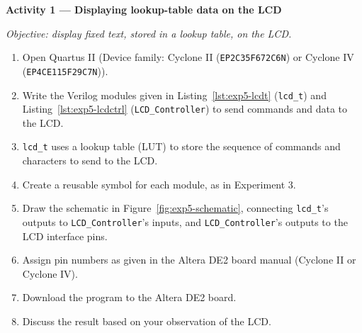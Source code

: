 \begin{procedure}

  \textbf{Activity 1 --- Displaying lookup-table data on the LCD}\vspace{2pt}

  \textit{Objective: display fixed text, stored in a lookup table, on the LCD.}

  \begin{enumerate}
    \item Open Quartus II (Device family: Cyclone II (\texttt{EP2C35F672C6N}) or Cyclone IV (\texttt{EP4CE115F29C7N})).
    \item Write the Verilog modules given in Listing~\ref{lst:exp5-lcdt} (\texttt{lcd\_t}) and Listing~\ref{lst:exp5-lcdctrl} (\texttt{LCD\_Controller}) to send commands and data to the LCD.
    \item \texttt{lcd\_t} uses a lookup table (LUT) to store the sequence of commands and characters to send to the LCD.
    \item Create a reusable symbol for each module, as in Experiment 3.
    \item Draw the schematic in Figure~\ref{fig:exp5-schematic}, connecting \texttt{lcd\_t}'s outputs to \texttt{LCD\_Controller}'s inputs, and \texttt{LCD\_Controller}'s outputs to the LCD interface pins.
    \item Assign pin numbers as given in the Altera DE2 board manual (Cyclone II or Cyclone IV).
    \item Download the program to the Altera DE2 board.
    \item Discuss the result based on your observation of the LCD.
  \end{enumerate}


\end{procedure}
